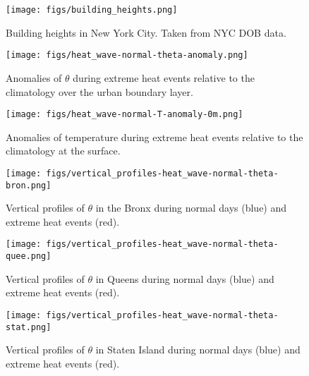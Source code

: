 \documentclass[11pt,a4paper]{article}
\begin{document}
\begin{figure}[ht]
	\centering
	\texttt{[image: figs/building\_heights.png]}
	\caption{Building heights in New York City. Taken from NYC DOB data.}
	\label{fig:building_heights}
\end{figure}


\begin{figure}[ht]
	\centering
	\texttt{[image: figs/heat\_wave-normal-theta-anomaly.png]}
	\caption{Anomalies of $\theta$ during extreme heat events relative to the climatology over the urban boundary layer.}
	\label{fig:extreme-heat-normal-comparison-contours-theta}
\end{figure}
\begin{figure}[ht]
	\centering
	\texttt{[image: figs/heat\_wave-normal-T-anomaly-0m.png]}
	\caption{Anomalies of temperature during extreme heat events relative to the climatology at the surface.}
	\label{fig:extreme_heat_normal_0m_comparison_T}
\end{figure}
\begin{figure}[ht]
	\centering
	\texttt{[image: figs/vertical\_profiles-heat\_wave-normal-theta-bron.png]}
	\caption{Vertical profiles of $\theta$ in the Bronx during normal days (blue) and extreme heat events (red).}
	\label{fig:vertical_profiles-heat_wave-normal-theta-bron}
\end{figure}
\begin{figure}[ht]
	\centering
	\texttt{[image: figs/vertical\_profiles-heat\_wave-normal-theta-quee.png]}
	\caption{Vertical profiles of $\theta$ in Queens during normal days (blue) and extreme heat events (red).}
	\label{fig:vertical_profiles-heat_wave-normal-theta-quee}
\end{figure}
\begin{figure}[ht]
	\centering
	\texttt{[image: figs/vertical\_profiles-heat\_wave-normal-theta-stat.png]}
	\caption{Vertical profiles of $\theta$ in Staten Island during normal days (blue) and extreme heat events (red).}
	\label{fig:vertical_profiles-heat_wave-normal-theta-stat}
\end{figure}
\end{document}
